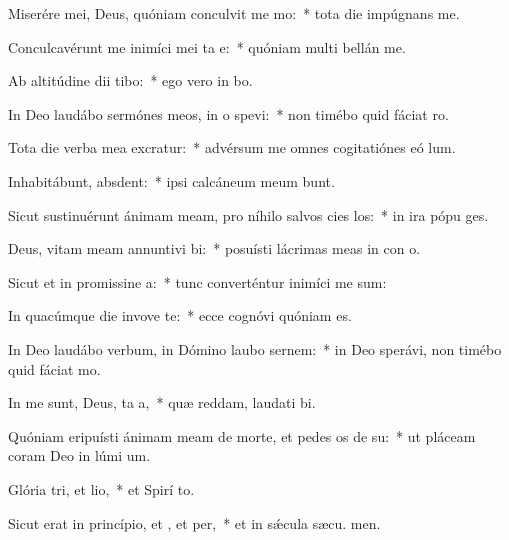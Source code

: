 \item Miserére mei, Deus, quóniam conculvit me mo:~* tota die impúgnans  me.
\item Conculcavérunt me inimíci mei ta e:~* quóniam multi bellán  me.
\item Ab altitúdine dii tibo:~* ego vero in  bo.
\item In Deo laudábo sermónes meos, in o spevi:~* non timébo quid fáciat  ro.
\item Tota die verba mea excratur:~* advérsum me omnes cogitatiónes eó  lum.
\item Inhabitábunt,  absdent:~* ipsi calcáneum meum bunt.
\item Sicut sustinuérunt ánimam meam, pro níhilo salvos cies los:~* in ira pópu ges.
\item Deus, vitam meam annuntivi bi:~* posuísti lácrimas meas in con o.
\item Sicut et in promissine a:~* tunc converténtur inimíci me sum:
\item In quacúmque die invove te:~* ecce cognóvi quóniam   es.
\item In Deo laudábo verbum, in Dómino laubo sernem:~* in Deo sperávi, non timébo quid fáciat  mo.
\item In me sunt, Deus, ta a,~* quæ reddam, laudati bi.
\item Quóniam eripuísti ánimam meam de morte, et pedes os de su:~* ut pláceam coram Deo in lúmi um.
\item Glória tri, et lio,~* et Spirí to.
\item Sicut erat in princípio, et , et per,~* et in sǽcula sæcu. men.
